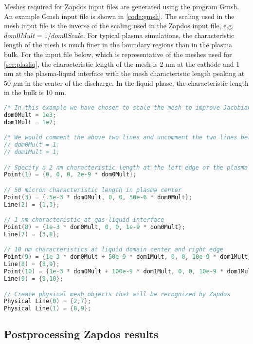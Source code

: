 Meshes required for Zapdos input files are generated using the program Gmsh. \cite{geuzaine2009gmsh} An example Gmsh input file is shown in \cref{code:gmsh}. The scaling used in the mesh input file is the inverse of the scaling used in the Zapdos input file, e.g. $dom0Mult = 1/dom0Scale$. For typical plasma simulations, the characteristic length of the mesh is much finer in the boundary regions than in the plasma bulk. For the input file below, which is representative of the meshes used for \cref{sec:plasliq}, the characteristic length of the mesh is 2 nm at the cathode and 1 nm at the plasma-liquid interface with the mesh characteristic length peaking at 50 $\mu$m in the center of the discharge. In the liquid phase, the characteristic length in the bulk is 10 nm.

\begin{lstlisting}[language=C++, caption=Gmsh input file used to create plasma and liquid domains for simulations in \cref{sec:plasliq}, label=code:gmsh]
/* In this example we have chosen to scale the mesh to improve Jacobian conditioning */
dom0Mult = 1e3;
dom1Mult = 1e7;

/* We would comment the above two lines and uncomment the two lines below if we did not want to scale the mesh */
// dom0Mult = 1;
// dom1Mult = 1;

// Specify a 2 nm characteristic length at the left edge of the plasma
Point(1) = {0, 0, 0, 2e-9 * dom0Mult};

// 50 micron characteristic length in plasma center
Point(3) = {.5e-3 * dom0Mult, 0, 0, 50e-6 * dom0Mult};
Line(2) = {1,3};

// 1 nm characteristic at gas-liquid interface
Point(8) = {1e-3 * dom0Mult, 0, 0, 1e-9 * dom0Mult};
Line(7) = {3,8};

// 10 nm characteristics at liquid domain center and right edge
Point(9) = {1e-3 * dom0Mult + 50e-9 * dom1Mult, 0, 0, 10e-9 * dom1Mult};
Line(8) = {8,9};
Point(10) = {1e-3 * dom0Mult + 100e-9 * dom1Mult, 0, 0, 10e-9 * dom1Mult};
Line(9) = {9,10};

// Create physical mesh objects that will be recognized by Zapdos
Physical Line(0) = {2,7};
Physical Line(1) = {8,9};
\end{lstlisting}

\subsection{Postprocessing Zapdos results}
\label{sec:zap_post}

